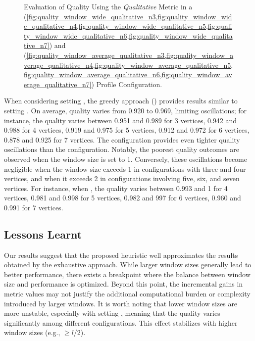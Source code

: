 \begin{figure}[H]
\begin{adjustbox}{minipage=\linewidth,scale=0.75}
\begin{subfigure}{0.45\textwidth}
      \end{subfigure}

    \caption{Evaluation of Quality Using the \emph{Qualitative} Metric in a \wide (\cref{fig:quality_window_wide_qualitative_n3,fig:quality_window_wide_qualitative_n4,fig:quality_window_wide_qualitative_n5,fig:quality_window_wide_qualitative_n6,fig:quality_window_wide_qualitative_n7}) and \average (\cref{fig:quality_window_average_qualitative_n3,fig:quality_window_average_qualitative_n4,fig:quality_window_average_qualitative_n5,fig:quality_window_average_qualitative_n6,fig:quality_window_average_qualitative_n7}) Profile Configuration.}  \label{fig:quality_window_qualitative}
  \end{adjustbox}
  \end{figure}

  When considering setting \average, the greedy approach () provides results similar to setting \wide. On average, quality varies from 0.920 to 0.969, limiting oscillations; for instance, the quality varies between 0.951 and 0.989 for 3 vertices, 0.942 and 0.988 for 4 vertices, 0.919 and 0.975 for 5 vertices, 0.912 and 0.972 for 6 vertices, 0.878 and 0.925 for 7 vertices. The \average configuration provides even tighter quality oscillations than the \wide configuration. Notably, the poorest quality outcomes are observed when the window size is set to 1. Conversely, these oscillations become negligible when the window size exceeds 1 in configurations with three and four vertices, and when it exceeds 2 in configurations involving five, six, and seven vertices.  For instance, when , the quality varies between  0.993 and 1 for 4 vertices, 0.981 and 0.998 for 5 vertices, 0.982 and 997 for 6 vertices, 0.960 and 0.991 for 7 vertices.
\subsection{Lessons Learnt}
  Our results suggest that the proposed heuristic well approximates the results obtained by the exhaustive approach. While larger window sizes generally lead to better performance, there exists a breakpoint where the balance between window size and performance is optimized. Beyond this point, the incremental gains in metric values may not justify the additional computational burden or complexity introduced by larger windows. It is worth noting that lower window sizes are more unstable, especially with setting \wide, meaning that the quality varies significantly among different configurations. This effect stabilizes with higher window sizes (e.g., \windowsize$\geq$$l$/2).





